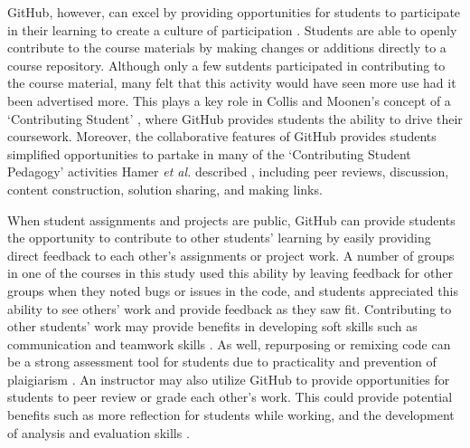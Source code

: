 GitHub, however, can excel by providing opportunities for students to participate in their learning to create a culture of participation \cite{jenkins2009confronting}. Students are able to openly contribute to the course materials by making changes or additions directly to a course repository. Although only a few sutdents participated in contributing to the course material, many felt that this activity would have seen more use had it been advertised more. This plays a key role in Collis and Moonen's concept of a `Contributing Student' \cite{collis2006contributing}, where GitHub provides students the ability to drive their coursework. Moreover, the collaborative features of GitHub provides students simplified opportunities to partake in many of the `Contributing Student Pedagogy' activities Hamer \textit{et al.} described \cite{hamer2011tools}, including peer reviews, discussion, content construction, solution sharing, and making links.

When student assignments and projects are public, GitHub can provide students the opportunity to contribute to other students' learning by easily providing direct feedback to each other's assignments or project work. A number of groups in one of the courses in this study used this ability by leaving feedback for other groups when they noted bugs or issues in the code, and students appreciated this ability to see others' work and provide feedback as they saw fit. Contributing to other students' work may provide benefits in developing soft skills such as communication and teamwork skills \cite{hamer2006some}. As well, repurposing or remixing code can be a strong assessment tool for students due to practicality and prevention of plaigiarism \cite{sant2015code}. An instructor may also utilize GitHub to provide opportunities for students to peer review or grade each other's work. This could provide potential benefits such as more reflection for students while working, and the development of analysis and evaluation skills \cite{sondergaard2012collaborative}.


